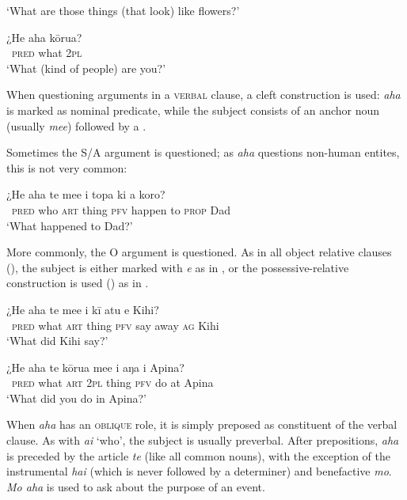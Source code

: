 \glt 
‘What are those things (that look) like flowers?’ \textstyleExampleref{[R210.195]} 
\z

\ea\label{ex:10.43}
\gll ¿He aha kōrua?\\
~\textsc{pred} what \textsc{2pl}\\

\glt 
‘What (kind of people) are you?’ \textstyleExampleref{[Egt-02.137]}
\z

When questioning arguments in a \textsc{verbal} clause, a cleft construction is used: \textit{aha} is marked as nominal predicate, while the subject  consists of an anchor noun (usually \textit{me{\ꞌ}e}) followed by a . 

Sometimes the S/A argument is questioned; as \textit{aha} questions non-human entites, this is not very common:

\ea\label{ex:10.44}
\gll ¿He aha te me{\ꞌ}e i topa ki a koro? \\
~\textsc{pred} who \textsc{art} thing \textsc{pfv} happen to \textsc{prop} Dad \\

\glt
‘What happened to Dad?’ \textstyleExampleref{[R615.594]} 
\z

More commonly, the O argument is questioned. As in all object relative clauses (), the subject is either marked with \textit{e} as in , or the possessive-relative construction is used () as in .

\ea\label{ex:10.45}
\gll ¿He aha te me{\ꞌ}e i kī atu e Kihi? \\
~\textsc{pred} what \textsc{art} thing \textsc{pfv} say away \textsc{ag} Kihi \\

\glt 
‘What did Kihi say?’ \textstyleExampleref{[R615.738]} 
\z

\ea\label{ex:10.46}
\gll ¿He aha te kōrua me{\ꞌ}e i aŋa i {\ꞌ}Apina? \\
~\textsc{pred} what \textsc{art} \textsc{2pl} thing \textsc{pfv} do at Apina \\

\glt 
‘What did you do in Apina?’ \textstyleExampleref{[R301.197]} 
\z

When \textit{aha} has an \textsc{oblique} role, it is simply preposed as constituent of the verbal clause. As with \textit{ai} ‘who’, the subject is usually preverbal. After prepositions, \textit{aha} is preceded by the article \textit{te} (like all common nouns), with the exception of the instrumental  \textit{hai} (which is never followed by a determiner) and benefactive \textit{mo}. \textit{Mo aha} is used to ask about the purpose of an event.

